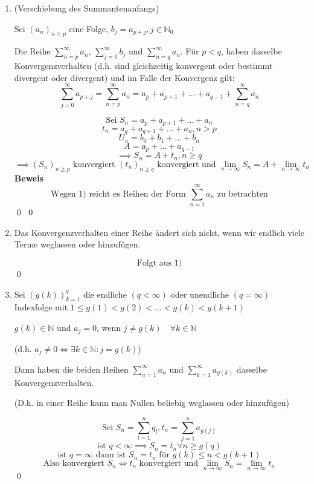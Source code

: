 \documentclass[fleqn]{scrbook}
\newcommand{\N}{\mathbb{N}}
\newcommand{\sumOI}{\sum_{n=1}^{\infty}}
\renewenvironment{proof}{{\bfseries Beweis }}{\qed}
\begin{document}
\begin{enumerate}
  \item (Verschiebung des Summantenanfangs)
  
  Sei $(a_n)_{n \geq p}$ eine Folge, $b_j = a_{p+j}, j \in \N_0$
  
  Die Reihe $\sum_{n=p}^\infty a_n$, $\sum_{j=0}^\infty b_j$ und $\sum_{n=q}^\infty a_n$. Für $p < q$, haben dasselbe Konvergenzverhalten (d.h. sind gleichzeitig konvergent oder bestimmt divergent oder divergent) und im Falle der Konvergenz gilt:
  \[\sum_{j=0}^\infty a_{p+j} = \sum_{n=p}^\infty a_n = a_p + a_{p+1} + \ldots + a_{q-1} + \sum_{n=q}^\infty a_n \]
  
  \begin{proof}
    \[\text{Sei } S_n = a_p + a_{p+1} + \ldots + a_n\]
    \[t_n = a_q + a_{q+1} + \ldots + a_n,n > p\]
    \[U_n = b_0 + b_1 + \ldots + b_n\]
    \[A = a_p+ \ldots + a_{q-1}\]
    \[\implies S_n = A+ t_n, n\geq q\]
    \[\implies (S_n)_{n\geq p} \text{ konvergiert } (t_n)_{n\geq q} \text{ konvergiert und } \lim_{n\to \infty} S_n = A + \lim_{n\to \infty} t_n\]
    \begin{proof}
      \[\text{Wegen 1) reicht es Reihen der Form } \sumOI a_n \text{ zu betrachten} \]
    \end{proof}
  \end{proof}  
  
  \item Das Konvergenzverhalten einer Reihe ändert sich nicht, wenn wir endlich viele Terme weglassen oder hinzufügen.
  
  \begin{proof}
    \[\text{Folgt aus 1)}\]
  \end{proof}    
  
  \item Sei $(g(k))_{k=1}^q$ die endliche $(q<\infty)$ oder unendliche $(q=\infty)$ Indexfolge mit $1\leq g(1) < g(2) < \ldots < g(k) < g(k+1)$
  
  $g(k)\in \N$ und $a_j=0$, wenn $j \neq g(k) \quad \forall k \in \N$
  
  (d.h. $a_j \neq 0 \Longleftrightarrow \exists k \in \N: j=g(k)$)
  
  Dann haben die beiden Reihen $\sumOI a_n$ und $\sum_{k=1}^\infty a_{g(k)}$ dasselbe Konvergenzverhalten.
  
  (D.h. in einer Reihe kann man Nullen beliebig weglassen oder hinzufügen)
  
  \begin{proof}
    \[\text{Sei } S_n=\sum_{l=1}^n q_l, t_n = \sum_{j=1}^n a_{g(j)}\]
    \[\text{ist } q<\infty \implies S_n = t_n \forall n \geq g(q)\]
    \[\text{ist } q=\infty \text{ dann ist } \boxed{S_n =t_n \text{ für } g(k)\leq n< g(k+1)}\]
    \[\text{Also konvergiert } S_n \Longleftrightarrow t_n \text{ konvergiert und } \lim_{n\to \infty} S_n = \lim_{n \to \infty} t_n\]
  \end{proof}
\end{enumerate}
\end{document}
